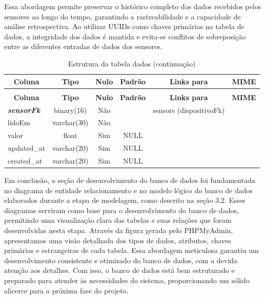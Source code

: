 \documentclass[tcc,capa]{texufpel}
\begin{document}
Essa abordagem permite preservar o histórico completo dos dados recebidos pelos sensores ao longo do tempo, garantindo a rastreabilidade e a capacidade de análise retrospectiva. Ao utilizar UUIDs como chaves primárias na tabela de dados, a integridade dos dados é mantida e evita-se conflitos de sobreposição entre as diferentes entradas de dados dos sensores.
%
%
\begin{longtable}{|l|c|c|c|l|l|}
\caption{Estrutura da tabela dados} \label{tab:dados-structure} \\
\hline \multicolumn{1}{|c|}{\textbf{Coluna}} & \multicolumn{1}{|c|}{\textbf{Tipo}} & \multicolumn{1}{|c|}{\textbf{Nulo}} & \multicolumn{1}{|c|}{\textbf{Padrão}} & \multicolumn{1}{|c|}{\textbf{Links para}} & \multicolumn{1}{|c|}{\textbf{MIME}} \\ \hline \hline
\endfirsthead
\caption{Estrutura da tabela dados (continuação)} \\ 
\hline \multicolumn{1}{|c|}{\textbf{Coluna}} & \multicolumn{1}{|c|}{\textbf{Tipo}} & \multicolumn{1}{|c|}{\textbf{Nulo}} & \multicolumn{1}{|c|}{\textbf{Padrão}} & \multicolumn{1}{|c|}{\textbf{Links para}} & \multicolumn{1}{|c|}{\textbf{MIME}} \\ \hline \hline \endhead \endfoot
\textbf{\textit{sensorFk}} & binary(16) & Não &  & sensors (dispositivoFk) &  \\ \hline
lidoEm & varchar(30) & Não &  &  &  \\ \hline
valor & float & Sim & NULL &  &  \\ \hline
updated\_at & varchar(20) & Sim & NULL &  &  \\ \hline
created\_at & varchar(20) & Sim & NULL &  &  \\ \hline
\end{longtable}


Em conclusão, a seção de desenvolvimento do banco de dados foi fundamentada no diagrama de entidade relacionamento e no modelo lógico do banco de dados elaborados durante a etapa de modelagem, como descrito na seção 3.2. Esses diagramas serviram como base para o desenvolvimento do banco de dados, permitindo uma visualização clara das tabelas e suas relações que foram desenvolvidas nesta etapa. Através da figura gerada pelo PHPMyAdmin, apresentamos uma visão detalhada dos tipos de dados, atributos, chaves primárias e estrangeiras de cada tabela. Essa abordagem meticulosa garantiu um desenvolvimento consistente e otimizado do banco de dados, com a devida atenção aos detalhes. Com isso, o banco de dados está bem estruturado e preparado para atender às necessidades do sistema, proporcionando um sólido alicerce para a próxima fase do projeto.
\end{document}
